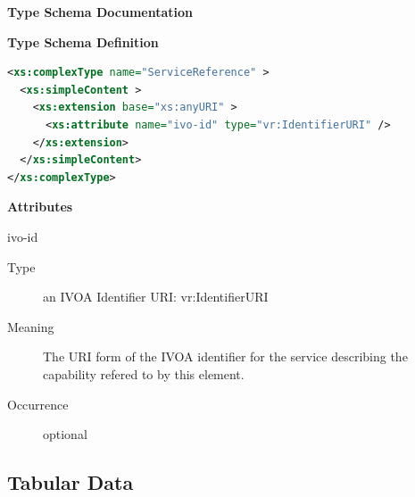 \documentclass[11pt,a4paper]{ivoa}
\begin{document}
\begin{generated}
\begingroup
        \renewcommand*\descriptionlabel[1]{%
        \hbox to 5.5em{\emph{#1}\hfil}}\vspace{2ex}\noindent\textbf{ Type Schema Documentation}


\vspace{1ex}\noindent\textbf{ Type Schema Definition}

\begin{lstlisting}[language=XML,basicstyle=\footnotesize]
<xs:complexType name="ServiceReference" >
  <xs:simpleContent >
    <xs:extension base="xs:anyURI" >
      <xs:attribute name="ivo-id" type="vr:IdentifierURI" />
    </xs:extension>
  </xs:simpleContent>
</xs:complexType>
\end{lstlisting}

\vspace{0.5ex}\noindent\textbf{ Attributes}

\begingroup\small\begin{bigdescription}
\item[ivo-id]
\begin{description}
\item[Type] an IVOA Identifier URI: vr:IdentifierURI
\item[Meaning]
                   The URI form of the IVOA identifier for the service
                   describing the capability refered to by this element.

\item[Occurrence] optional
\end{description}


\end{bigdescription}\endgroup

\endgroup
\end{generated}



\subsection{Tabular Data}
\label{sect:table}
\end{document}
